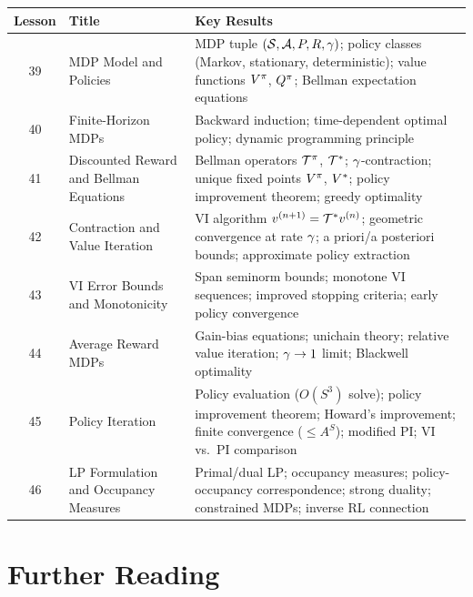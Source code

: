 \documentclass[11pt,a4paper]{article}
\begin{document}
\begin{center}
\begin{tabular}{clp{6.5cm}}
\toprule
\textbf{Lesson} & \textbf{Title} & \textbf{Key Results} \\
\midrule
39 & MDP Model and Policies &
    MDP tuple $(\mathcal{S}, \mathcal{A}, P, R, \gamma)$; policy
    classes (Markov, stationary, deterministic); value functions
    $V^{\pi}$, $Q^{\pi}$; Bellman expectation equations \\[4pt]
40 & Finite-Horizon MDPs &
    Backward induction; time-dependent optimal policy; dynamic
    programming principle \\[4pt]
41 & Discounted Reward and Bellman Equations &
    Bellman operators $\mathcal{T}^\pi$, $\mathcal{T}^*$;
    $\gamma$-contraction; unique fixed points $V^{\pi}$, $V^*$;
    policy improvement theorem; greedy optimality \\[4pt]
42 & Contraction and Value Iteration &
    VI algorithm $v^{(n+1)} = \mathcal{T}^* v^{(n)}$; geometric
    convergence at rate $\gamma$; a priori/a posteriori bounds;
    approximate policy extraction \\[4pt]
43 & VI Error Bounds and Monotonicity &
    Span seminorm bounds; monotone VI sequences; improved stopping
    criteria; early policy convergence \\[4pt]
44 & Average Reward MDPs &
    Gain-bias equations; unichain theory; relative value iteration;
    $\gamma \to 1$ limit; Blackwell optimality \\[4pt]
45 & Policy Iteration &
    Policy evaluation ($O(S^3)$ solve); policy improvement theorem;
    Howard's improvement; finite convergence ($\leq A^S$); modified
    PI; VI vs.\ PI comparison \\[4pt]
46 & LP Formulation and Occupancy Measures &
    Primal/dual LP; occupancy measures; policy-occupancy
    correspondence; strong duality; constrained MDPs; inverse
    RL connection \\
\bottomrule
\end{tabular}
\end{center}


\section{Further Reading}
\label{sec:further-reading}
\end{document}
